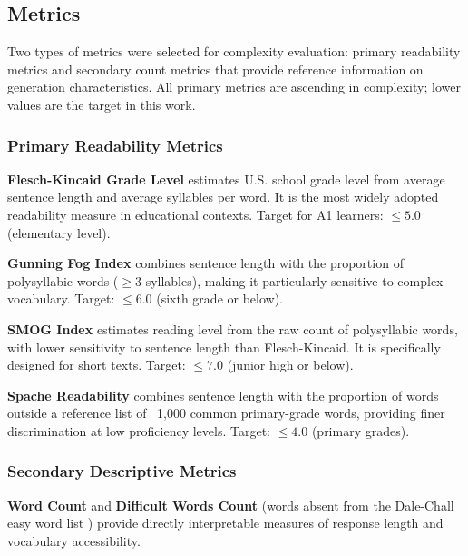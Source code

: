 \documentclass[10pt, a4paper]{article}
\begin{document}
\subsection{Metrics}
Two types of metrics were selected for complexity evaluation: primary readability metrics and
secondary count metrics that provide reference information on generation characteristics.
All primary metrics are ascending in complexity; lower values are the target in this work.

\subsubsection{Primary Readability Metrics}

\textbf{Flesch-Kincaid Grade Level} \cite{kincaid1975derivation} estimates U.S. school grade
level from average sentence length and average syllables per word.
It is the most widely adopted readability measure in educational contexts.
Target for A1 learners: $\leq 5.0$ (elementary level).

\textbf{Gunning Fog Index} \cite{gunning1952technique} combines sentence length with the
proportion of polysyllabic words ($\geq$3 syllables), making it particularly sensitive to
complex vocabulary.
Target: $\leq 6.0$ (sixth grade or below).

\textbf{SMOG Index} \cite{mclaughlin1969smog} estimates reading level from the raw count of
polysyllabic words, with lower sensitivity to sentence length than Flesch-Kincaid.
It is specifically designed for short texts.
Target: $\leq 7.0$ (junior high or below).

\textbf{Spache Readability} \cite{spache1953new} combines sentence length with the proportion
of words outside a reference list of ~1,000 common primary-grade words, providing finer
discrimination at low proficiency levels.
Target: $\leq 4.0$ (primary grades).

\subsubsection{Secondary Descriptive Metrics}

\textbf{Word Count} and \textbf{Difficult Words Count} (words absent from the Dale-Chall easy
word list \cite{dale1948formula}) provide directly interpretable measures of response length
and vocabulary accessibility.


\end{document}
